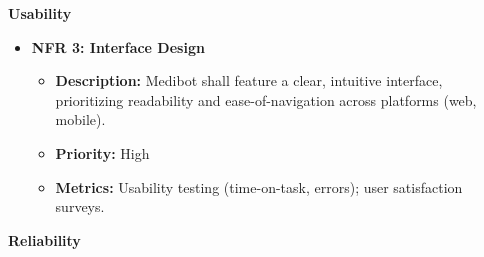 

\textbf{Usability}

\begin{itemize}
    \item \textbf{NFR 3: Interface Design}  
        \begin{itemize}
            \item \textbf{Description:} Medibot shall feature a clear, intuitive interface, prioritizing readability and ease-of-navigation across platforms (web, mobile).
            \item \textbf{Priority:} High
            \item \textbf{Metrics:}  Usability testing (time-on-task, errors); user satisfaction surveys.
        \end{itemize}
\end{itemize}


\textbf{Reliability}

